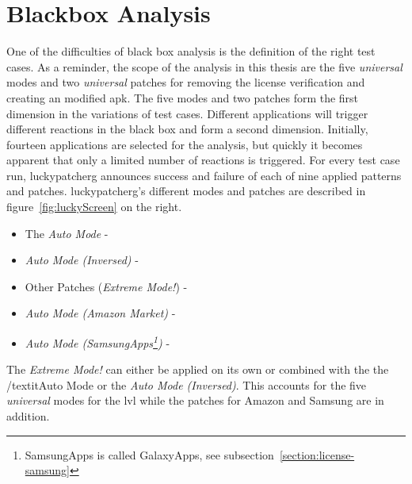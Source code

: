 \section{Blackbox Analysis} \label{section:luckypatcher-blackbox}
One of the difficulties of black box analysis is the definition of the right test cases.
As a reminder, the scope of the analysis in this thesis are the five \textit{universal} modes and two \textit{universal} patches for removing the license verification and creating an modified \gls{apk}.
The five modes and two patches form the first dimension in the variations of test cases.
Different applications will trigger different reactions in the black box and form a second dimension.
\newline
Initially, fourteen applications are selected for the analysis, but quickly it becomes apparent that only a limited number of reactions is triggered.
For every test case run, \gls{luckypatcherg} announces success and failure of each of nine applied patterns and patches.
\newline
\gls{luckypatcherg}’s different modes and patches are described in figure~\ref{fig:luckyScreen} on the right.
\begin{itemize}
\item The \textit{Auto Mode} - \grqq
\item \textit{Auto Mode (Inversed)} - \grqq
\item Other Patches (\textit{Extreme Mode!}) - \grqq
\item \textit{Auto Mode (Amazon Market)} - \grqq
\item \textit{Auto Mode (SamsungApps\footnote[1]{SamsungApps is called GalaxyApps, see subsection~\ref{section:license-samsung}})} - \grqq
\end{itemize}
The \textit{Extreme Mode!} can either be applied on its own or combined with the the /textit{Auto Mode} or the \textit{Auto Mode (Inversed)}.
This accounts for the five \textit{universal} modes for the \gls{lvl} while the patches for Amazon and Samsung are in addition.
